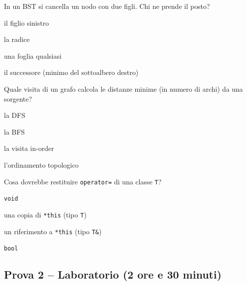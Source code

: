 \begin{quiz}{In un BST si cancella un nodo con due figli. Chi ne prende il posto?}
  \item il figlio sinistro
  \item la radice
  \item una foglia qualsiasi
  \item il successore (minimo del sottoalbero destro)
\end{quiz}

\begin{quiz}{Quale visita di un grafo calcola le distanze minime (in numero di archi) da una sorgente?}
  \item la DFS
  \item la BFS
  \item la visita in-order
  \item l'ordinamento topologico
\end{quiz}

\begin{quiz}{Cosa dovrebbe restituire \texttt{operator=} di una classe \texttt{T}?}
  \item \texttt{void}
  \item una copia di \texttt{*this} (tipo \texttt{T})
  \item un riferimento a \texttt{*this} (tipo \texttt{T\&})
  \item \texttt{bool}
\end{quiz}

\subsection*{Prova 2 -- Laboratorio (2 ore e 30 minuti)}

